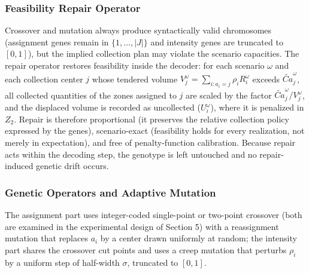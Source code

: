 \documentclass[11pt, a4paper]{article}
\begin{document}
\subsubsection{Feasibility Repair Operator}
Crossover and mutation always produce syntactically valid chromosomes (assignment genes remain in $\{1,\ldots,|J|\}$ and intensity genes are truncated to $[0,1]$), but the implied collection plan may violate the scenario capacities. The repair operator restores feasibility inside the decoder: for each scenario $\omega$ and each collection center $j$ whose tendered volume $V_j^{\omega} = \sum\limits_{i: a_i = j} \rho_i R_i^{\omega}$ exceeds $\widetilde{Ca}_j^{\omega}$, all collected quantities of the zones assigned to $j$ are scaled by the factor $\widetilde{Ca}_j^{\omega} / V_j^{\omega}$, and the displaced volume is recorded as uncollected ($U_i^{\omega}$), where it is penalized in $Z_2$. Repair is therefore proportional (it preserves the relative collection policy expressed by the genes), scenario-exact (feasibility holds for every realization, not merely in expectation), and free of penalty-function calibration. Because repair acts within the decoding step, the genotype is left untouched and no repair-induced genetic drift occurs.
\subsubsection{Genetic Operators and Adaptive
Mutation}
The assignment part uses integer-coded single-point or two-point crossover (both are examined in the experimental design of Section 5) with a reassignment mutation that replaces $a_i$ by a center drawn uniformly at random; the intensity part shares the crossover cut points and uses a creep mutation that perturbs $\rho_i$ by a uniform step of half-width $\sigma$, truncated to $[0,1]$.
\end{document}
